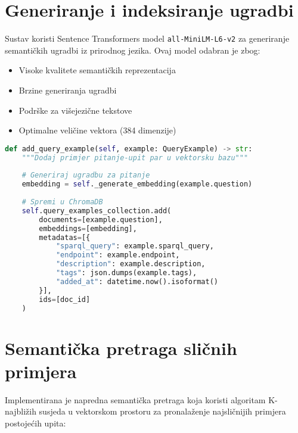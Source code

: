 \section{Generiranje i indeksiranje ugradbi}
\label{sec:embedding_generation}

Sustav koristi Sentence Transformers model \texttt{all-MiniLM-L6-v2} za generiranje semantičkih ugradbi iz prirodnog jezika. Ovaj model odabran je zbog:
\begin{itemize}
    \item Visoke kvalitete semantičkih reprezentacija
    \item Brzine generiranja ugradbi
    \item Podrške za višejezične tekstove
    \item Optimalne veličine vektora (384 dimenzije)
\end{itemize}

\begin{lstlisting}[language=Python, caption=Generiranje ugradbi i dodavanje primjera]
def add_query_example(self, example: QueryExample) -> str:
    """Dodaj primjer pitanje-upit par u vektorsku bazu"""
    
    # Generiraj ugradbu za pitanje
    embedding = self._generate_embedding(example.question)
    
    # Spremi u ChromaDB
    self.query_examples_collection.add(
        documents=[example.question],
        embeddings=[embedding],
        metadatas=[{
            "sparql_query": example.sparql_query,
            "endpoint": example.endpoint,
            "description": example.description,
            "tags": json.dumps(example.tags),
            "added_at": datetime.now().isoformat()
        }],
        ids=[doc_id]
    )
\end{lstlisting}

\section{Semantička pretraga sličnih primjera}
\label{sec:similarity_search}

Implementirana je napredna semantička pretraga koja koristi algoritam K-najbližih susjeda u vektorskom prostoru za pronalaženje najsličnijih primjera postojećih upita:

